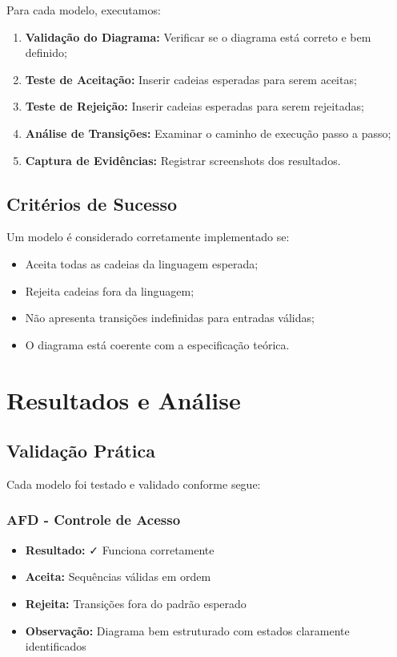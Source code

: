 \documentclass[12pt,a4paper]{article}
\begin{document}
Para cada modelo, executamos:

\begin{enumerate}
    \item \textbf{Validação do Diagrama:} Verificar se o diagrama está correto e bem definido;
    \item \textbf{Teste de Aceitação:} Inserir cadeias esperadas para serem aceitas;
    \item \textbf{Teste de Rejeição:} Inserir cadeias esperadas para serem rejeitadas;
    \item \textbf{Análise de Transições:} Examinar o caminho de execução passo a passo;
    \item \textbf{Captura de Evidências:} Registrar screenshots dos resultados.
\end{enumerate}

\subsection{Critérios de Sucesso}

Um modelo é considerado corretamente implementado se:
\begin{itemize}
    \item Aceita todas as cadeias da linguagem esperada;
    \item Rejeita cadeias fora da linguagem;
    \item Não apresenta transições indefinidas para entradas válidas;
    \item O diagrama está coerente com a especificação teórica.
\end{itemize}

\newpage

\section{Resultados e Análise}

\subsection{Validação Prática}

Cada modelo foi testado e validado conforme segue:

\subsubsection{AFD - Controle de Acesso}

\begin{itemize}
    \item \textbf{Resultado:} ✓ Funciona corretamente
    \item \textbf{Aceita:} Sequências válidas em ordem
    \item \textbf{Rejeita:} Transições fora do padrão esperado
    \item \textbf{Observação:} Diagrama bem estruturado com estados claramente identificados
\end{itemize}
\end{document}
